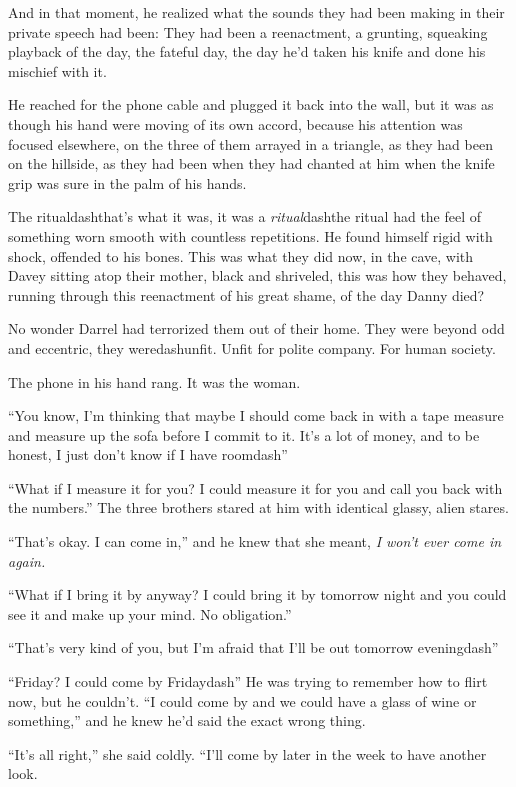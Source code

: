And in that moment, he realized what the sounds they had been making
in their private speech had been:  They had been a reenactment, a
grunting, squeaking playback of the day, the fateful day, the day he'd
taken his knife and done his mischief with it.

He reached for the phone cable and plugged it back into the wall, but
it was as though his hand were moving of its own accord, because his
attention was focused elsewhere, on the three of them arrayed in a
triangle, as they had been on the hillside, as they had been when they
had chanted at him when the knife grip was sure in the palm of his
hands.

The ritualdash{}that's what it was, it was a \textit{ritual}dash{}the ritual
had the feel of something worn smooth with countless repetitions.  He
found himself rigid with shock, offended to his bones.  This was what
they did now, in the cave, with Davey sitting atop their mother, black
and shriveled, this was how they behaved, running through this
reenactment of his great shame, of the day Danny died?

No wonder Darrel had terrorized them out of their home.  They were
beyond odd and eccentric, they weredash{}unfit.  Unfit for polite
company.  For human society.

The phone in his hand rang.  It was the woman.

``You know, I'm thinking that maybe I should come back in with a tape
measure and measure up the sofa before I commit to it.  It's a lot of
money, and to be honest, I just don't know if I have roomdash{}''

``What if I measure it for you?  I could measure it for you and call
you back with the numbers.'' The three brothers stared at him with
identical glassy, alien stares.

``That's okay.  I can come in,'' and he knew that she meant, \textit{I
won't ever come in again.}

``What if I bring it by anyway?  I could bring it by tomorrow night
and you could see it and make up your mind.  No obligation.''

``That's very kind of you, but I'm afraid that I'll be out tomorrow
eveningdash{}''

``Friday?  I could come by Fridaydash{}'' He was trying to remember how
to flirt now, but he couldn't.  ``I could come by and we could have a
glass of wine or something,'' and he knew he'd said the exact wrong
thing.

``It's all right,'' she said coldly.  ``I'll come by later in the week
to have another look.

